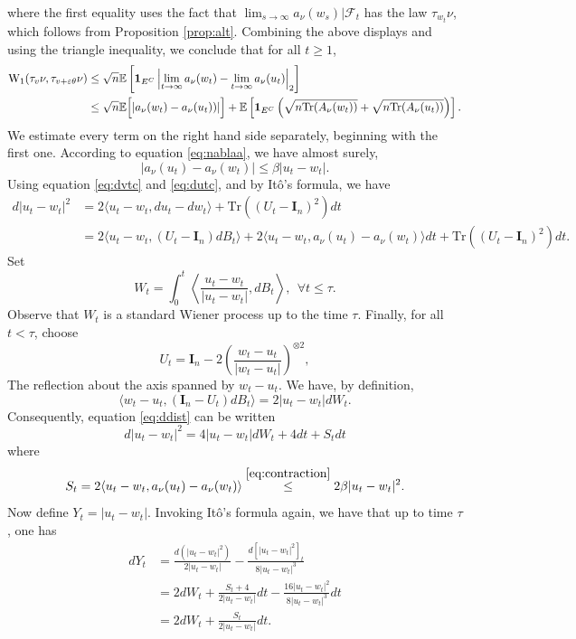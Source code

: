 \documentclass[12pt]{article}
\def \EE {\mathbb E}
\def \eps {\varepsilon}
\def \Id {\mathbf{I}_n}
\def \FF {\mathcal{F}}
\theoremstyle{definition}
\theoremstyle{remark}
\begin{document}
where the first equality uses the fact that $\lim_{s \to \infty} a_\nu(w_s) | \FF_t$ has the law $\tau_{w_t} \nu$, which follows from Proposition \ref{prop:alt}. Combining the above displays and using the triangle inequality, we conclude that for all $t \geq 1$,
\begin{align}
\mathrm{W}_1(\tau_v \nu, \tau_{v + \eps \theta} \nu) & \leq \sqrt{n} \EE \left  [ \mathbf{1}_{E^C} \left | \lim_{t \to \infty} a_\nu(w_t) - \lim_{t \to \infty} a_\nu(u_t) \right  |_2 \right ] \nonumber \\
& \leq \sqrt{n} \EE \Bigl [ | a_\nu(w_t) - a_\nu(u_t))| \Bigr ] + \EE \left [ \mathbf{1}_{E^C} \left (\sqrt{n\mathrm{Tr}(A_\nu(w_t))} + \sqrt{n\mathrm{Tr}(A_\nu(u_t))} \right ) \right ]. \label{eq:combinedbound}
\end{align}
We estimate every term on the right hand side separately, beginning with the first one. According to equation \eqref{eq:nablaa}, we have almost surely,
\begin{equation}\label{eq:contraction}
|a_\nu(u_t) - a_{\nu} (w_t)| \leq \beta |u_t - w_t|.
\end{equation}
Using equation \eqref{eq:dvtc} and \eqref{eq:dutc}, and by It\^o's formula, we have
\begin{align}
d |u_t - w_t|^2 & = 2 \langle u_t - w_t, d u_t - d w_t \rangle + \mathrm{Tr} \left ((U_t - \Id)^2\right ) dt \nonumber \\ 
& = 2 \langle u_t - w_t, (U_t  - \Id) d B_t \rangle + 2 \langle u_t - w_t, a_\nu(u_t) - a_{\nu} (w_t) \rangle dt + \mathrm{Tr} \left ((U_t - \Id)^2\right ) dt. \label{eq:ddist}
\end{align}
Set
$$
W_t = \int_0^t \left \langle \frac{u_t - w_t}{|u_t - w_t|}, d B_t \right \rangle, ~~  \forall t \leq \tau.
$$
Observe that $W_t$ is a standard Wiener process up to the time $\tau$. Finally, for all $t< \tau$, choose 
$$
U_t = \Id - 2 \left (\frac{w_t - u_t}{|w_t - u_t|} \right )^{\otimes 2},
$$
The reflection about the axis spanned by $w_t-u_t$. We have, by definition,
$$
\langle w_t - u_t, (\Id - U_t) d B_t \rangle = 2 |u_t - w_t| d W_t.
$$
Consequently, equation \eqref{eq:ddist} can be written
$$
d |u_t - w_t|^2 = 4 |u_t-w_t| d W_t + 4 dt + S_t dt
$$
where
$$
S_t = 2 \langle u_t - w_t, a_\nu(u_t) - a_{\nu} (w_t) \rangle \stackrel{\eqref{eq:contraction}}{\leq} 2 \beta |u_t - w_t|^2.
$$
Now define $Y_t = |u_t - w_t|$. Invoking It\^o's formula again, we have that up to time $\tau$, one has
\begin{align*}
d Y_t & = \frac{d \left (|u_t - w_t|^2 \right )}{2 |u_t - w_t|} - \frac{d \left [|u_t - w_t|^2 \right ]_t}{8  |u_t - w_t|^3} \\
& = 2 d W_t + \frac{S_t + 4}{2 |u_t - w_t|} dt - \frac{16 |u_t - w_t|^2 }{8 |u_t - w_t|^3} dt \\
& = 2 d W_t + \frac{S_t}{2 |u_t - w_t|} dt.
\end{align*}
\end{document}
